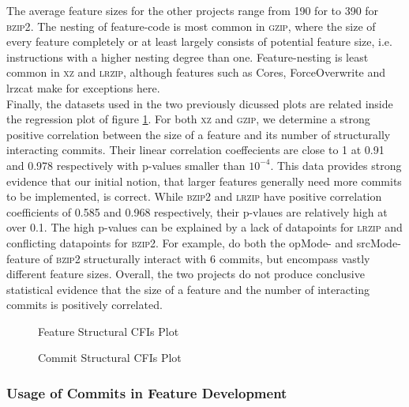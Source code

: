 The average feature sizes for the other projects range from 190 for  to 390 for \textsc{bzip2}. 
The nesting of feature-code is most common in \textsc{gzip}, where the size of every feature completely or at least largely consists of potential feature size, i.e. instructions with a higher nesting degree than one.
Feature-nesting is least common in \textsc{xz} and \textsc{lrzip}, although features such as \textsf{Cores}, \textsf{ForceOverwrite} and \textsf{lrzcat} make for exceptions here. \\
Finally, the datasets used in the two previously dicussed plots are related inside the regression plot of figure \ref{fig:feature_sfbr_plot}.
For both \textsc{xz} and \textsc{gzip}, we determine a strong positive correlation between the size of a feature and its number of structurally interacting commits.
Their linear correlation coeffecients are close to 1 at 0.91 and 0.978 respectively with p-values smaller than $10^{-4}$.
This data provides strong evidence that our initial notion, that larger features generally need more commits to be implemented, is correct.
While \textsc{bzip2} and \textsc{lrzip} have positive correlation coefficients of 0.585 and 0.968 respectively, their p-vlaues are relatively high at over 0.1.
The high p-values can be explained by a lack of datapoints for \textsc{lrzip} and conflicting datapoints for \textsc{bzip2}.
For example, do both the \textsf{opMode}- and \textsf{srcMode}-feature of \textsc{bzip2} structurally interact with 6 commits, but encompass vastly different feature sizes.
Overall, the two projects do not produce conclusive statistical evidence that the size of a feature and the number of interacting commits is positively correlated.


\clearpage

\begin{figure}[htbp]
  \centering
  
  \caption{Feature Structural CFIs Plot}
  \label{fig:feature_sfbr_plot}
\end{figure}

\clearpage

\begin{figure}[htbp]
  \centering
  
  \caption{Commit Structural CFIs Plot}
  \label{fig:commit_sfbr_plot}
\end{figure}

\subsubsection*{Usage of Commits in Feature Development}\label{sec:eval_commit_usage}

